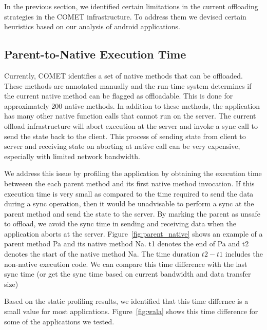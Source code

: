 In the previous section, we identified certain limitations in the current offloading strategies
in the COMET infrastructure. To address them we devised certain heuristics based on our analysis
of android applications.

\subsection{Parent-to-Native Execution Time}
Currently, COMET identifies a set of native methods that can be offloaded. These methods are annotated manually
and the run-time system determines if the current native method can be flagged as offloadable. This is done for
approximately 200 native methods. In addition to these methods, the application has many other native function calls
that cannot run on the server. The current offload infrastructure will abort execution at the server and invoke a sync
call to send the state back to the client. This process of sending state from client to server and receiving state on
aborting at native call can be very expensive, especially with limited network bandwidth.

We address this issue by profiling the application by obtaining the execution time betweeen the each parent method and its
first native method invocation. If this execution time is very small as compared to the time required to send the data during
a sync operation, then it would be unadvisable to perform a sync at the parent method and send the state to the server. By marking the parent as
unsafe to offload, we avoid the sync time in sending and receiving data when the application aborts at the server.
Figure~\ref{fig:parent_native} shows an example of a parent method Pa and its native method Na. t1 denotes the end of Pa and t2
denotes the start of the native method Na. The time duration $t2-t1$ includes the non-native execution code. We can compare this
time difference with the last sync time (or get the sync time based on current bandwidth and data transfer size)

Based on the static profiling results, we identified that this time differnce is a small value for most applications.
Figure~\ref{fig:wala} shows this time difference for some of the applications we tested.

